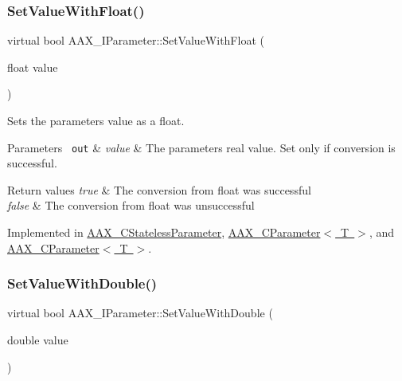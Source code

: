 \subsubsection{\texorpdfstring{SetValueWithFloat()}{SetValueWithFloat()}}
{\footnotesize\ttfamily virtual bool A\+A\+X\+\_\+\+I\+Parameter\+::\+Set\+Value\+With\+Float (\begin{DoxyParamCaption}\item[{float}]{value }\end{DoxyParamCaption})\hspace{0.3cm}{\ttfamily [pure virtual]}}



Sets the parameter\textquotesingle{}s value as a float. 


\begin{DoxyParams}[1]{Parameters}
\mbox{\texttt{ out}}  & {\em value} & The parameter\textquotesingle{}s real value. Set only if conversion is successful.\\
\hline
\end{DoxyParams}

\begin{DoxyRetVals}{Return values}
{\em true} & The conversion from float was successful \\
\hline
{\em false} & The conversion from float was unsuccessful \\
\hline
\end{DoxyRetVals}


Implemented in \mbox{\hyperlink{a01541_aa44752ab96e44c0be7f2c2f9d84f71a1}{A\+A\+X\+\_\+\+C\+Stateless\+Parameter}}, \mbox{\hyperlink{a01537_aa06c3f670310e2022c89385b354fc2c8}{A\+A\+X\+\_\+\+C\+Parameter$<$ T $>$}}, and \mbox{\hyperlink{a01537_ab3f589671d20c826859b4398e96ee9bb}{A\+A\+X\+\_\+\+C\+Parameter$<$ T $>$}}.

\mbox{\label{a01857_a95e2d31931b586f43e42d41f2dce7c6d}} 
\subsubsection{\texorpdfstring{SetValueWithDouble()}{SetValueWithDouble()}}
{\footnotesize\ttfamily virtual bool A\+A\+X\+\_\+\+I\+Parameter\+::\+Set\+Value\+With\+Double (\begin{DoxyParamCaption}\item[{double}]{value }\end{DoxyParamCaption})\hspace{0.3cm}{\ttfamily [pure virtual]}}



